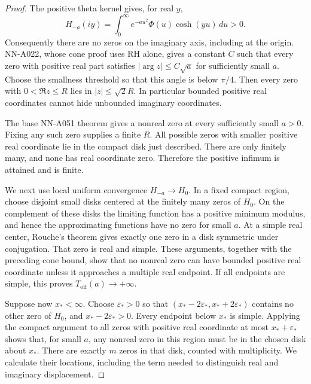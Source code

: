 \begin{proof}
The positive theta kernel gives, for real \(y\),
\[
 H_{-a}(iy)=\int_0^\infty e^{-au^2}\Phi(u)\cosh(yu)\,du>0.
\]
Consequently there are no zeros on the imaginary axis, including
at the origin. NN-A022, whose cone proof uses RH alone, gives
a constant \(C\) such that every zero with positive real part
satisfies \(|\arg z|\le C\sqrt a\) for sufficiently small \(a\).
Choose the smallness threshold so that this angle is below
\(\pi/4\). Then every zero with \(0<\Re z\le R\) lies in
\(|z|\le\sqrt2 R\). In particular bounded positive real
coordinates cannot hide unbounded imaginary coordinates.

The base NN-A051 theorem gives a nonreal zero at every sufficiently
small \(a>0\). Fixing any such zero supplies a finite \(R\).
All possible zeros with smaller positive real coordinate lie in
the compact disk just described. There are only finitely many,
and none has real coordinate zero. Therefore the positive infimum
is attained and is finite.

We next use local uniform convergence \(H_{-a}\to H_0\).
In a fixed compact region, choose disjoint small disks centered
at the finitely many zeros of \(H_0\). On the complement of
these disks the limiting function has a positive minimum modulus,
and hence the approximating functions have no zero for small \(a\).
At a simple real center, Rouche's theorem gives exactly one zero
in a disk symmetric under conjugation. That zero is real and
simple. These arguments, together with the preceding cone bound,
show that no nonreal zero can have bounded positive real
coordinate unless it approaches a multiple real endpoint.
If all endpoints are simple, this proves
\(T_{\mathrm{off}}(a)\to+\infty\).

Suppose now \(x_*<\infty\). Choose \(\varepsilon_*>0\) so that
\((x_*-2\varepsilon_*,x_*+2\varepsilon_*)\) contains no other
zero of \(H_0\), and \(x_*-2\varepsilon_*>0\).
Every endpoint below \(x_*\) is simple. Applying the compact
argument to all zeros with positive real coordinate at most
\(x_*+\varepsilon_*\) shows that, for small \(a\), any nonreal
zero in this region must be in the chosen disk about \(x_*\).
There are exactly \(m\) zeros in that disk, counted with
multiplicity. We calculate their locations, including the term
needed to distinguish real and imaginary displacement.


\end{proof}
